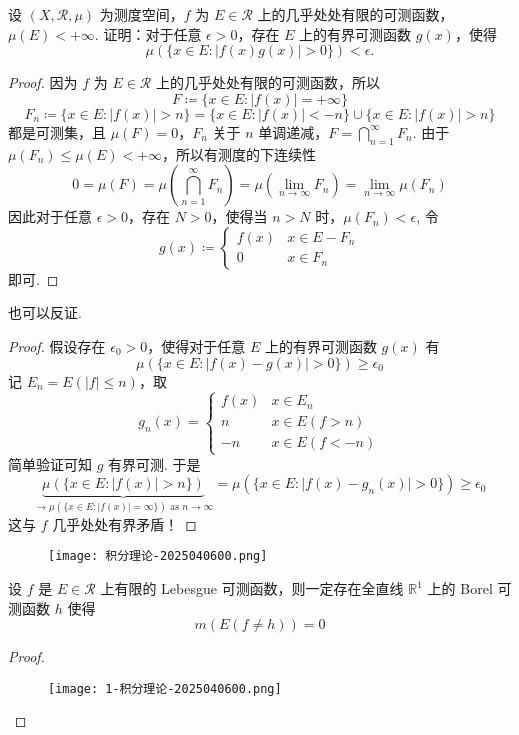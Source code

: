 \begin{exercise}[逼近·几乎处处有限的可测函数]
设 $(X,\mathcal{R},\mu)$ 为测度空间，$f$ 为 $E\in \mathcal{R}$ 上的几乎处处有限的可测函数，$\mu(E)<+\infty$. 证明：对于任意 $\epsilon>0$，存在 $E$ 上的有界可测函数 $g(x)$，使得
\[
\mu(\{ x\in E:\lvert f(x)g(x) \rvert >0 \})<\epsilon.
\]
\end{exercise}
\begin{proof}
因为 $f$ 为 $E\in \mathcal{R}$ 上的几乎处处有限的可测函数，所以
\[
F\coloneqq \{ x\in E :\lvert f(x) \rvert =+\infty\}
\]
\[
F_n\coloneqq \{ x\in E :\lvert f(x) \rvert >n\}=\{ x\in E:\lvert f(x) \rvert <-n \}\cup \{ x\in E:\lvert f(x) \rvert >n \}
\]
都是可测集，且 $\mu(F)=0$，$F_n$ 关于 $n$ 单调递减，$F=\bigcap_{n=1}^{\infty}F_n$. 由于 $\mu(F_n)\leq \mu(E)<+\infty$，所以有测度的下连续性
\[
0=\mu(F)=\mu\left( \bigcap_{n=1}^{\infty} F_n \right)=\mu(\lim_{ n \to \infty } F_n)=\lim_{ n \to \infty } \mu(F_n)
\]
因此对于任意 $\epsilon>0$，存在 $N>0$，使得当 $n>N$ 时，$\mu(F_n)<\epsilon$, 令
\[
g(x)\coloneqq \begin{cases}
f(x) & x\in E-F_n \\
0 & x\in F_n
\end{cases}
\]
即可.

\end{proof}

\begin{remark}
也可以反证.
\end{remark}
\begin{proof}
假设存在 $\epsilon_0>0$，使得对于任意 $E$ 上的有界可测函数 $g(x)$ 有
\[
\mu(\{ x\in E:\lvert f(x)-g(x) \rvert >0 \})\geq \epsilon_0
\]
记 $E_n=E(\lvert f \rvert\leq n)$，取
\[
g_n(x)=\begin{cases}
f(x) & x\in E_n \\
n & x\in E(f>n) \\
-n & x\in E(f<-n)
\end{cases}
\]
简单验证可知 $g$ 有界可测. 于是
\[
\underbrace{ \mu(\{ x\in E:\lvert f(x) \rvert >n \}) }_{ \to \mu(\{ x\in E:\lvert f(x) \rvert =\infty \})\text{ as }n\to \infty }=\mu(\{ x\in E :\lvert f(x)-g_n(x) \rvert >0\})\geq \epsilon_0
\]
这与 $f$ 几乎处处有界矛盾！
\end{proof}

\begin{definition}
\begin{figure}[H]
\centering
\texttt{[image: 积分理论-2025040600.png]}
\label{}
\end{figure}
\end{definition}
\begin{exercise}
设 $f$ 是 $E\in \mathcal{R}$ 上有限的 Lebesgue 可测函数，则一定存在全直线 $\mathbb{R}^{1}$ 上的 Borel 可测函数 $h$ 使得
\[
m(E(f\neq h))=0
\]
\end{exercise}
\begin{proof}
\begin{figure}[H]
\centering
\texttt{[image: 1-积分理论-2025040600.png]}
\label{}
\end{figure}
\end{proof}


